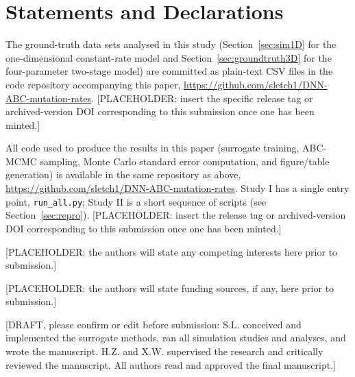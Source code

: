 \documentclass[sn-basic,iicol,pdflatex]{sn-jnl}
\begin{document}
\backmatter

\section*{Statements and Declarations}

The ground-truth data sets analysed in this study (Section~\ref{sec:sim1D}
for the one-dimensional constant-rate model and Section~\ref{sec:groundtruth3D}
for the four-parameter two-stage model) are committed as plain-text CSV files in the code
repository accompanying this paper, \url{https://github.com/sletch1/DNN-ABC-mutation-rates}.
[PLACEHOLDER: insert the specific release tag or archived-version DOI
corresponding to this submission once one has been minted.]

All code used to produce the results in this paper (surrogate training,
ABC-MCMC sampling, Monte Carlo standard error computation, and figure/table
generation) is available in the same repository as above,
\url{https://github.com/sletch1/DNN-ABC-mutation-rates}. Study I has a
single entry point, \texttt{run\_all.py}; Study II is a short sequence of scripts
(see Section~\ref{sec:repro}). [PLACEHOLDER: insert the
release tag or archived-version DOI corresponding to this submission once
one has been minted.]

[PLACEHOLDER: the authors will state any competing interests here prior to
submission.]

[PLACEHOLDER: the authors will state funding sources, if any, here prior to
submission.]

[DRAFT, please confirm or edit before submission: S.L. conceived and
implemented the surrogate methods, ran all simulation studies and analyses,
and wrote the manuscript. H.Z. and X.W. supervised the research and
critically reviewed the manuscript. All authors read and approved the final
manuscript.]


\end{document}
